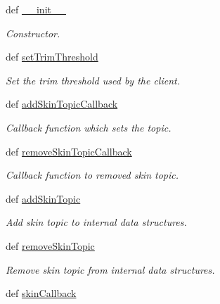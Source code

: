 \begin{DoxyCompactItemize}
\item 
def \hyperlink{classhrl__haptic__mpc_1_1skin__client_1_1_taxel_array_client_ae4cc6f82e28c07be67fdb4471bb15c0c}{\-\_\-\-\_\-init\-\_\-\-\_\-}
\begin{DoxyCompactList}\small\item\em \-Constructor. \end{DoxyCompactList}\item 
def \hyperlink{classhrl__haptic__mpc_1_1skin__client_1_1_taxel_array_client_a6b54a427ea5723dcd5f54abc217df41a}{set\-Trim\-Threshold}
\begin{DoxyCompactList}\small\item\em \-Set the trim threshold used by the client. \end{DoxyCompactList}\item 
def \hyperlink{classhrl__haptic__mpc_1_1skin__client_1_1_taxel_array_client_a75a9a8d039214284470c8c0abbb806b9}{add\-Skin\-Topic\-Callback}
\begin{DoxyCompactList}\small\item\em \-Callback function which sets the topic. \end{DoxyCompactList}\item 
def \hyperlink{classhrl__haptic__mpc_1_1skin__client_1_1_taxel_array_client_a57f311e5bacdd205548745d0d9e9194a}{remove\-Skin\-Topic\-Callback}
\begin{DoxyCompactList}\small\item\em \-Callback function to removed skin topic. \end{DoxyCompactList}\item 
def \hyperlink{classhrl__haptic__mpc_1_1skin__client_1_1_taxel_array_client_aac854b6c368700470be18c4223de9450}{add\-Skin\-Topic}
\begin{DoxyCompactList}\small\item\em \-Add skin topic to internal data structures. \end{DoxyCompactList}\item 
def \hyperlink{classhrl__haptic__mpc_1_1skin__client_1_1_taxel_array_client_ab1af6f78c4379e9531e585f536f4c737}{remove\-Skin\-Topic}
\begin{DoxyCompactList}\small\item\em \-Remove skin topic from internal data structures. \end{DoxyCompactList}\item 
def \hyperlink{classhrl__haptic__mpc_1_1skin__client_1_1_taxel_array_client_ad953882bbd4259d2e6db360d0e0ec668}{skin\-Callback}

\end{DoxyCompactItemize}
